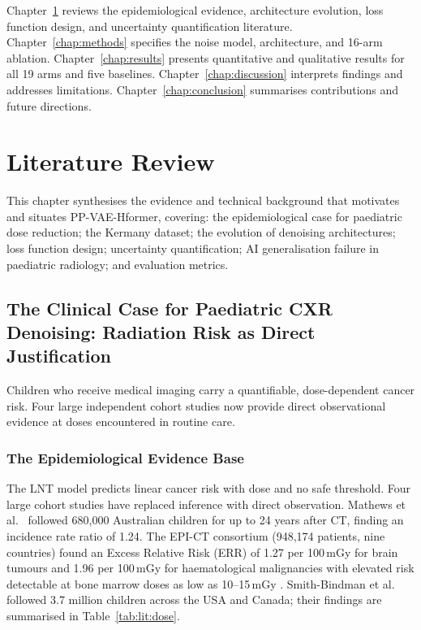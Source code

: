 \documentclass[12pt, a4paper, twoside, openright]{book}
\begin{document}
Chapter~\ref{chap:lit} reviews the epidemiological evidence, architecture evolution, loss function design, and uncertainty quantification literature. Chapter~\ref{chap:methods} specifies the noise model, architecture, and 16-arm ablation. Chapter~\ref{chap:results} presents quantitative and qualitative results for all 19 arms and five baselines. Chapter~\ref{chap:discussion} interprets findings and addresses limitations. Chapter~\ref{chap:conclusion} summarises contributions and future directions.

\chapter{Literature Review}
\label{chap:lit}

This chapter synthesises the evidence and technical background that motivates and situates PP-VAE-Hformer, covering: the epidemiological case for paediatric dose reduction; the Kermany dataset; the evolution of denoising architectures; loss function design; uncertainty quantification; AI generalisation failure in paediatric radiology; and evaluation metrics.

\section{The Clinical Case for Paediatric CXR Denoising: Radiation Risk as Direct Justification}
\label{sec:lit:radiation}

Children who receive medical imaging carry a quantifiable, dose-dependent cancer risk. Four large independent cohort studies now provide direct observational evidence at doses encountered in routine care.

\subsection{The Epidemiological Evidence Base}
\label{sec:lit:radiation:evidence}

The LNT model \cite{international_commission_on_radiological_protection_2007_2007, national_research_council_health_2006} predicts linear cancer risk with dose and no safe threshold. Four large cohort studies have replaced inference with direct observation. Mathews et al.\ \cite{mathews_cancer_2013} followed 680,000 Australian children for up to 24 years after CT, finding an incidence rate ratio of 1.24. The EPI-CT consortium (948,174 patients, nine countries) found an Excess Relative Risk (ERR) of 1.27 per 100\,mGy for brain tumours \cite{hauptmann_brain_2023} and 1.96 per 100\,mGy for haematological malignancies with elevated risk detectable at bone marrow doses as low as 10--15\,mGy \cite{bosch_de_basea_gomez_risk_2023}. Smith-Bindman et al.\ \cite{smith-bindman_hematologic_2025} followed 3.7 million children across the USA and Canada; their findings are summarised in Table~\ref{tab:lit:dose}.
\end{document}
